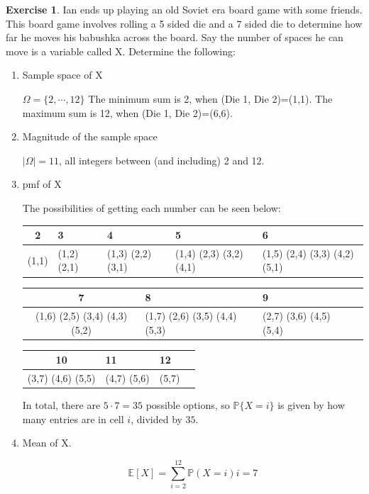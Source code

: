 \documentclass[12pt]{amsart}
\theoremstyle{definition}
\newtheorem{exercise}{Exercise}
\numberwithin{equation}{section}
\theoremstyle{plain}
\newcommand{\E}{\mathbb{E}}
\renewcommand{\P}{\mathbb{P}}
\begin{document}
\begin{exercise}
Ian ends up playing an old Soviet era board game with some friends. This board game involves rolling a 5 sided die and a 7 sided die to determine how far he moves his babushka across the board. Say the number of spaces he can move is a variable called X. Determine the following:
\end{exercise}
\begin{enumerate}[label=\Alph*.]
\item Sample space of X
\begin{answer}
    $\Omega = \{2,\cdots, 12\}$ The minimum sum is 2, when (Die 1, Die 2)=(1,1). The maximum sum is 12, when (Die 1, Die 2)=(6,6).
    \end{answer}
\item Magnitude of the sample space
\begin{answer}
$|\Omega| = 11$, all integers between (and including) 2 and 12.
\end{answer}

\item pmf of X
\begin{answer}
The possibilities of getting each number can be seen below:

\begin{tabular}{|c|p{3cm}|p{3cm}|p{3cm}|p{3cm}|}
\hline
2 & 3 & 4 & 5 & 6 \\ \hline
(1,1) &
(1,2) (2,1) &
(1,3) (2,2) (3,1) &
(1,4) (2,3) (3,2) (4,1) &
(1,5) (2,4) (3,3) (4,2) (5,1) \\
\hline
\end{tabular}

\vspace{0.5em}

\begin{tabular}{|c|p{4cm}|p{4cm}|p{4cm}|}
\hline
7 & 8 & 9 \\ \hline
(1,6) (2,5) (3,4) (4,3) (5,2) &
(1,7) (2,6) (3,5) (4,4) (5,3) &
(2,7) (3,6) (4,5) (5,4) \\
\hline
\end{tabular}

\vspace{0.5em}

\begin{tabular}{|c|p{4cm}|p{4cm}|p{4cm}|}
\hline
10 & 11 & 12 \\ \hline
(3,7) (4,6) (5,5) &
(4,7) (5,6) &
(5,7) \\
\hline
\end{tabular}

In total, there are $5 \cdot 7 = 35$ possible options, so $\P\{X = i\}$ is given by how many entries are in cell $i$, divided by $35$.
\end{answer}\item Mean of X.
\begin{answer}
\[
        \E[X] = \sum_{i=2}^{12} \P(X = i) i = 7
    \]
\end{answer}


\end{enumerate}
\end{document}
